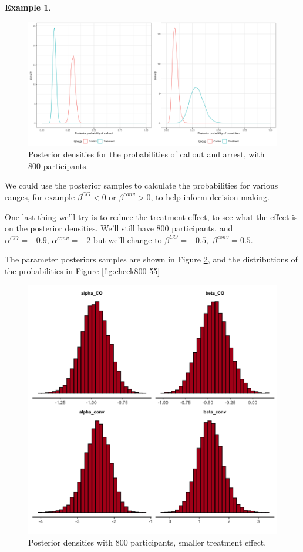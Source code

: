 \documentclass[
  openany]{book}
\theoremstyle{definition}
\theoremstyle{definition}
\newtheorem{example}{Example}[chapter]
\theoremstyle{definition}
\theoremstyle{definition}
\theoremstyle{remark}
\begin{document}
\begin{example}
\begin{figure}
\includegraphics[width=1\linewidth]{images/ggpost800} \caption{Posterior densities for the probabilities of callout and arrest, with 800 participants.}\label{fig:check800}
\end{figure}

We could use the posterior samples to calculate the probabilities for various ranges, for example \(\beta^{CO}<0\) or \(\beta^{conv}>0\), to help inform decision making.

One last thing we'll try is to reduce the treatment effect, to see what the effect is on the posterior densities. We'll still have 800 participants, and \(\alpha^{CO}=-0.9,\,\alpha^{conv}=-2\) but we'll change to \(\beta^{CO}=-0.5,\,\,\beta^{conv}=0.5\).

The parameter posteriors samples are shown in Figure \ref{fig:par800-55}, and the distributions of the probabilities in Figure \ref{fig:check800-55}

\begin{figure}
\includegraphics[width=6.67in]{images/ggpostparam800_55} \caption{Posterior densities with 800 participants, smaller treatment effect.}\label{fig:par800-55}
\end{figure}


\end{example}
\end{document}
